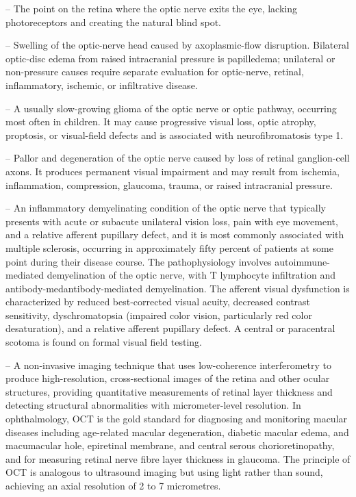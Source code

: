 -- The point on the retina where the optic nerve exits the eye, lacking photoreceptors and creating the natural blind spot.

-- Swelling of the optic-nerve head caused by axoplasmic-flow disruption. Bilateral optic-disc edema from raised intracranial pressure is papilledema; unilateral or non-pressure causes require separate evaluation for optic-nerve, retinal, inflammatory, ischemic, or infiltrative disease.

-- A usually slow-growing glioma of the optic nerve or optic pathway, occurring most often in children. It may cause progressive visual loss, optic atrophy, proptosis, or visual-field defects and is associated with neurofibromatosis type 1.

-- Pallor and degeneration of the optic nerve caused by loss of retinal ganglion-cell axons. It produces permanent visual impairment and may result from ischemia, inflammation, compression, glaucoma, trauma, or raised intracranial pressure.

-- An inflammatory demyelinating condition of the optic nerve that typically presents with acute or subacute unilateral vision loss, pain with eye movement, and a relative afferent pupillary defect, and it is most commonly associated with multiple sclerosis, occurring in approximately fifty percent of patients at some point during their disease course. The pathophysiology involves autoimmune-mediated demyelination of the optic nerve, with T lymphocyte infiltration and antibody-medantibody-mediated demyelination. The afferent visual dysfunction is characterized by reduced best-corrected visual acuity, decreased contrast sensitivity, dyschromatopsia (impaired color vision, particularly red color desaturation), and a relative afferent pupillary defect. A central or paracentral scotoma is found on formal visual field testing.

-- A non-invasive imaging technique that uses low-coherence interferometry to produce high-resolution, cross-sectional images of the retina and other ocular structures, providing quantitative measurements of retinal layer thickness and detecting structural abnormalities with micrometer-level resolution. In ophthalmology, OCT is the gold standard for diagnosing and monitoring macular diseases including age-related macular degeneration, diabetic macular edema, and macumacular hole, epiretinal membrane, and central serous chorioretinopathy, and for measuring retinal nerve fibre layer thickness in glaucoma. The principle of OCT is analogous to ultrasound imaging but using light rather than sound, achieving an axial resolution of 2 to 7 micrometres.

